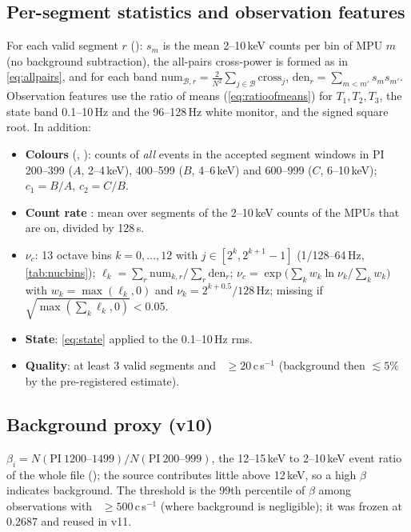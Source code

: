 \subsection{Per-segment statistics and observation features}
For each valid segment $r$ (): $s_m$ is the mean 2--10\,keV counts per bin of MPU $m$ (no
background subtraction), the all-pairs cross-power is formed as in \cref{eq:allpairs}, and for each band
$\mathrm{num}_{\mathcal B,r}=\frac{2}{N^2}\sum_{j\in\mathcal B}\mathrm{cross}_j$, $\mathrm{den}_r=\sum_{m<m'}s_ms_{m'}$.
Observation features use the ratio of means (\cref{eq:ratioofmeans}) for $T_1,T_2,T_3$, the state band 0.1--10\,Hz and the
96--128\,Hz white monitor, and the signed square root. In addition:
\begin{itemize}
\item \textbf{Colours} (, ): counts of \emph{all} events in the accepted segment windows in PI 200--399
($A$, 2--4\,keV), 400--599 ($B$, 4--6\,keV) and 600--999 ($C$, 6--10\,keV); $c_1=B/A$, $c_2=C/B$.
\item \textbf{Count rate} : mean over segments of the 2--10\,keV counts of the MPUs that are on, divided
by 128\,s.
\item \textbf{$\nu_c$}: 13 octave bins $k=0,\dots,12$ with $j\in[2^k,2^{k+1}-1]$ (1/128--64\,Hz, \cref{tab:nucbins});
$\ell_k=\sum_r\mathrm{num}_{k,r}/\sum_r\mathrm{den}_r$; $\nu_c=\exp\bigl(\sum_k w_k\ln\nu_k/\sum_kw_k\bigr)$ with
$w_k=\max(\ell_k,0)$ and $\nu_k = 2^{k+0.5}/128$\,Hz; missing if $\sqrt{\max(\sum_k\ell_k,0)}<0.05$.
\item \textbf{State}: \cref{eq:state} applied to the 0.1--10\,Hz rms.
\item \textbf{Quality}: at least 3 valid segments and ~$\ge20$\,c\,s$^{-1}$ (background then
$\lesssim5\%$ by the pre-registered estimate).
\end{itemize}

\subsection{Background proxy (v10)}
$\beta_i = N(\mathrm{PI}\ 1200\text{--}1499)/N(\mathrm{PI}\ 200\text{--}999)$, the 12--15\,keV to 2--10\,keV event ratio of the
whole file (); the source contributes little above 12\,keV, so a high $\beta$ indicates
background. The threshold is the 99th percentile of $\beta$ among observations with ~$\ge500$\,c\,s$^{-1}$
(where background is negligible); it was frozen at 0.2687 and reused in v11.

